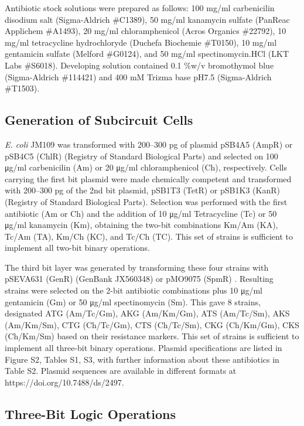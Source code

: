 Antibiotic stock solutions were prepared as follows: 100 mg/ml carbenicilin disodium salt (Sigma-Aldrich \#C1389), 50 mg/ml kanamycin sulfate (PanReac Applichem \#A1493), 20 mg/ml chloramphenicol (Acros Organics \#22792), 10 mg/ml tetracycline hydrochloryde (Duchefa Biochemie \#T0150), 10 mg/ml gentamicin sulfate (Melford \#G0124), and 50 mg/ml spectinomycin.HCl (LKT Labs \#S6018). Developing solution contained 0.1 \%w/v bromothymol blue (Sigma-Aldrich \#114421) and 400 mM Trizma base pH7.5 (Sigma-Aldrich \#T1503).

\subsection{\textbf{Generation of Subcircuit Cells}}

\textit{E. coli} JM109 was transformed with 200–300 pg of plasmid pSB4A5 (AmpR) or pSB4C5 (ChlR) (Registry of Standard Biological Parts) and selected on 100 μg/ml carbenicilin (Am) or 20 μg/ml chloramphenicol (Ch), respectively. Cells carrying the first bit plasmid were made chemically competent \cite{chung1989one} and transformed with 200–300 pg of the 2nd bit plasmid, pSB1T3 (TetR) or pSB1K3 (KanR) (Registry of Standard Biological Parts). Selection was performed with the first antibiotic (Am or Ch) and the addition of 10 μg/ml Tetracycline (Tc) or 50 μg/ml kanamycin (Km), obtaining the two-bit combinations Km/Am (KA), Tc/Am (TA), Km/Ch (KC), and Tc/Ch (TC). This set of strains is sufficient to implement all two-bit binary operations.

The third bit layer was generated by transforming these four strains with pSEVA631 (GenR) \cite{silva2012standard} (GenBank JX560348) or pMO9075 (SpmR) \cite{keller2011methods}. Resulting strains were selected on the 2-bit antibiotic combinations plus 10 μg/ml gentamicin (Gm) or 50 μg/ml spectinomycin (Sm). This gave 8 strains, designated ATG (Am/Tc/Gm), AKG (Am/Km/Gm), ATS (Am/Tc/Sm), AKS (Am/Km/Sm), CTG (Ch/Tc/Gm), CTS (Ch/Tc/Sm), CKG (Ch/Km/Gm), CKS (Ch/Km/Sm) based on their resistance markers. This set of strains is sufficient to implement all three-bit binary operations. Plasmid specifications are listed in Figure S2, Tables S1, S3, with further information about these antibiotics in Table S2. Plasmid sequences are available in different formats at https://doi.org/10.7488/ds/2497.

\subsection{\textbf{Three-Bit Logic Operations}}

